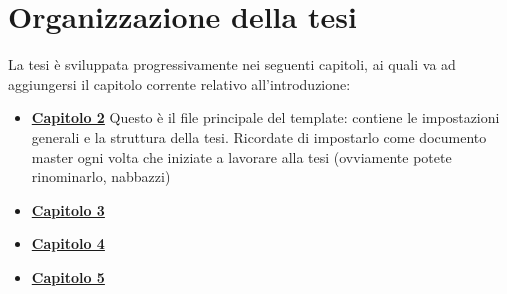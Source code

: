 
\section{Organizzazione della tesi}
\label{sec:intro4}
La tesi è sviluppata progressivamente nei seguenti capitoli, ai quali va ad aggiungersi il capitolo corrente relativo all'introduzione:


\begin{itemize}
    \item\hyperref[chap:cap2]{\textbf{Capitolo 2}} Questo è il file principale del template: contiene le impostazioni generali e la struttura della tesi. Ricordate di impostarlo come documento master ogni volta che iniziate a lavorare alla tesi (ovviamente potete rinominarlo, nabbazzi)
    \item\hyperref[chap:cap2]{\textbf{Capitolo 3}} 
    \item\hyperref[chap:cap2]{\textbf{Capitolo 4}} 
    \item\hyperref[chap:cap2]{\textbf{Capitolo 5}}
\end{itemize}

